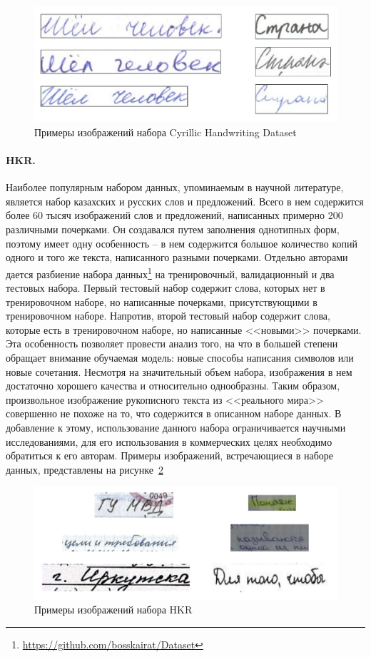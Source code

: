 \begin{figure}[h!]
    \centering
    \includegraphics[width=\textwidth]{img/cyrillic}
    \caption{Примеры изображений набора Cyrillic Handwriting Dataset}
    \label{fig:cyrillic-examples}
\end{figure}

\paragraph{HKR.}{Наиболее популярным набором данных, упоминаемым в научной литературе, является набор казахских и русских слов и предложений.
Всего в нем содержится более 60 тысяч изображений слов и предложений, написанных примерно 200 различными почерками.
Он создавался путем заполнения однотипных форм, поэтому имеет одну особенность -- в нем содержится большое количество копий одного и того же текста, написанного разными почерками.
Отдельно авторами дается разбиение набора данных\footnote{\url{https://github.com/bosskairat/Dataset}} на тренировочный, валидационный и два тестовых набора.
Первый тестовый набор содержит слова, которых нет в тренировочном наборе, но написанные почерками, присутствующими в тренировочном наборе.
Напротив, второй тестовый набор содержит слова, которые есть в тренировочном наборе, но написанные <<новыми>> почерками.
Эта особенность позволяет провести анализ того, на что в большей степени обращает внимание обучаемая модель: новые способы написания символов или новые сочетания.
Несмотря на значительный объем набора, изображения в нем достаточно хорошего качества и относительно однообразны.
Таким образом, произвольное изображение рукописного текста из <<реального мира>> совершенно не похоже на то, что содержится в описанном наборе данных.
В добавление к этому, использование данного набора ограничивается научными исследованиями, для его использования в коммерческих целях необходимо обратиться к его авторам.
Примеры изображений, встречающиеся в наборе данных, представлены на рисунке~\ref{fig:hkr-examples}}

\begin{figure}[h!]
    \centering
    \includegraphics[width=\textwidth]{img/hkr}
    \caption{Примеры изображений набора HKR}
    \label{fig:hkr-examples}
\end{figure}

